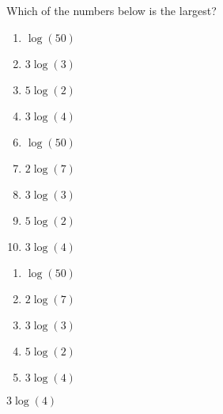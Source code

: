 


 Which of the numbers below is the largest?


\ifsat
	\begin{enumerate}[label=\Alph*)]
		\item   $\log(50)$
		\item  $3\log(3)$
		\item  $5\log(2)$
		\item  $3\log(4)$%
	\end{enumerate}
\else
\fi

\ifacteven
	\begin{enumerate}[label=\textbf{\Alph*.},itemsep=\fill,align=left]
		\setcounter{enumii}{5}
		\item   $\log(50)$
		\item  $2\log(7)$
		\item  $3\log(3)$
		\addtocounter{enumii}{1}
		\item  $5\log(2)$
		\item  $3\log(4)$%
	\end{enumerate}
\else
\fi

\ifactodd
	\begin{enumerate}[label=\textbf{\Alph*.},itemsep=\fill,align=left]
		\item   $\log(50)$
		\item  $2\log(7)$
		\item  $3\log(3)$
		\item  $5\log(2)$
		\item  $3\log(4)$%
	\end{enumerate}
\else
\fi

\ifgridin
  $3\log(4)$%

\else
\fi

